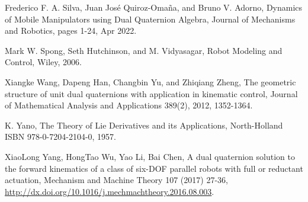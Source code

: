 \documentclass[reqno,12pt]{amsart}
\begin{document}
\begin{thebibliography}{99}
 Frederico F. A. Silva, Juan Jos\'e Quiroz-Oma\~na, and Bruno V. Adorno, Dynamics of Mobile Manipulators using Dual Quaternion Algebra, Journal of Mechanisms and Robotics, pages 1-24, Apr 2022.

 Mark W. Spong, Seth Hutchinson, and M. Vidyasagar, Robot Modeling and Control, Wiley, 2006.

 Xiangke Wang, Dapeng Han, Changbin Yu, and Zhiqiang Zheng, The geometric structure of unit dual quaternions with application in kinematic control, Journal of Mathematical Analysis and Applications 389(2), 2012, 1352-1364.

 K. Yano, The Theory of Lie Derivatives and its Applications, North-Holland ISBN 978-0-7204-2104-0, 1957.

 XiaoLong Yang, HongTao Wu, Yao Li, Bai Chen, A dual quaternion solution to the forward kinematics of a class of six-DOF parallel robots with full or reductant actuation, Mechanism and Machine Theory 107 (2017) 27-36, \url{http://dx.doi.org/10.1016/j.mechmachtheory.2016.08.003}.

\end{thebibliography}
\end{document}
